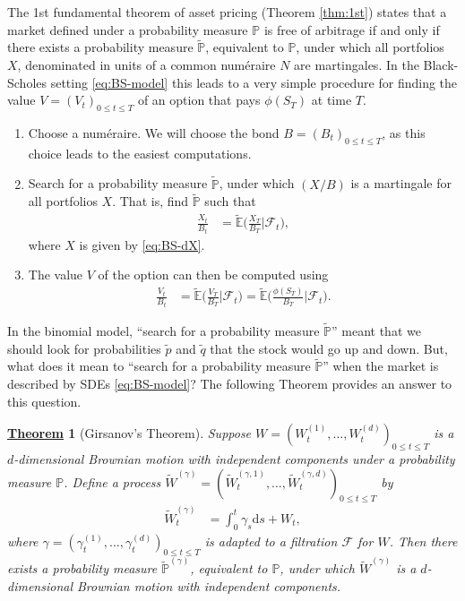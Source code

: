 \documentclass[12pt]{book}
\numberwithin{equation}{chapter}
\theoremstyle{plain}
\newtheorem{theorem}{\underline{Theorem}}
\numberwithin{theorem}{section}
\theoremstyle{definition}
\numberwithin{exercise}{chapter}
\newcommand{\<}{\langle}
\renewcommand{\>}{\rangle}
\renewcommand{\(}{\left(}
\renewcommand{\)}{\right)}
\renewcommand{\[}{\left[}
\renewcommand{\]}{\right]}
\newcommand\Eb{\mathds{E}}
\newcommand\Pb{\mathds{P}}
\newcommand\Fc{\mathscr{F}}
\newcommand\gam{\gamma}
\newcommand\Ebt{\widetilde{\Eb}}
\newcommand\Pbt{\widetilde{\Pb}}
\newcommand\Wt{\widetilde{W}}
\newcommand\qt{\widetilde{q}}
\newcommand\dd{\mathrm{d}}
\theoremstyle{definition}
\numberwithin{question}{section}
\newcommand\pt{\widetilde{p}}
\begin{document}
The 1st fundamental theorem of asset pricing (Theorem \ref{thm:1st}) states that a market defined under a probability measure $\Pb$ is free of arbitrage if and only if there exists a probability measure $\Pbt$, equivalent to $\Pb$, under which all portfolios $X$, denominated in units of a common num\'eraire $N$ are martingales.  
In the Black-Scholes setting \eqref{eq:BS-model} this leads to a very simple procedure for finding the value $V = (V_t)_{0 \leq t \leq T}$ of an option that pays $\phi(S_T)$ at time $T$.
\begin{enumerate}
\item Choose a num\'eraire.  We will choose the bond $B=(B_t)_{0 \leq t \leq T}$, as this choice leads to the easiest computations.
\item Search for a probability measure $\Pbt$, under which $(X/B)$ is a martingale for all portfolios $X$.  That is, find $\Pbt$ such that
\begin{align}
\frac{X_t}{B_t}
	&=	\Ebt \Big( \frac{X_T}{B_T} \Big| \Fc_t \Big) , 
\end{align} 
where $X$ is given by \eqref{eq:BS-dX}.
\item The value $V$ of the option can then be computed using
\begin{align}
\frac{V_t}{B_t}
	&=	\Ebt \Big( \frac{V_T}{B_T} \Big| \Fc_t \Big) 
	 = 	\Ebt \Big( \frac{\phi(S_T)}{B_T} \Big| \Fc_t \Big) . \label{eq:V-price}
\end{align}
\end{enumerate}

\noindent
In the binomial model, ``search for a probability measure $\Pbt$'' meant that we should look for probabilities $\pt$ and $\qt$ that the stock would go up and down.  
But, what does it mean to ``search for a probability measure $\Pbt$'' when the market is described by SDEs \eqref{eq:BS-model}?  The following Theorem provides an answer to this question.

\begin{theorem}[Girsanov's Theorem]
\label{thm:girsanov}
Suppose $W = (W_t^{(1)},\ldots,W_t^{(d)})_{0 \leq t \leq T}$ is a $d$-dimensional Brownian motion with independent components under a probability measure $\Pb$.  Define a process $\Wt^{(\gam)} = (\Wt_t^{(\gam,1)},\ldots,\Wt_t^{(\gam,d)})_{0 \leq t \leq T}$ by
\begin{align}
\Wt_t^{(\gam)}
	&=	\int_0^t \gam_s \dd s + W_t , \label{eq:W-tilde}
\end{align}
where $\gam = (\gam_t^{(1)},\ldots,\gam_t^{(d)})_{0 \leq t \leq T}$ is adapted to a filtration $\Fc$ for $W$.
Then there exists a probability measure $\Pbt^{(\gam)}$, equivalent to $\Pb$, under which $\Wt^{(\gam)}$ is a $d$-dimensional Brownian motion with independent components.
\end{theorem}
\end{document}
